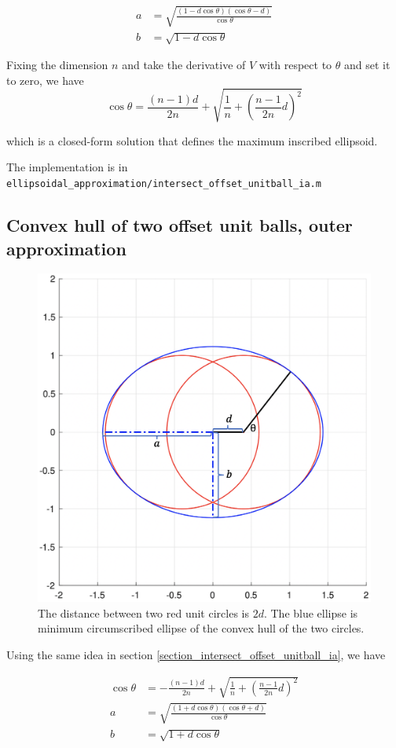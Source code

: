 \documentclass{article}
\begin{document}
\begin{align*}
a & = \sqrt{\frac{(1-d\cos\theta)(\cos\theta-d)}{\cos\theta}}\\
b & = \sqrt{1 - d\cos\theta}
\end{align*}

Fixing the dimension $n$ and take the derivative of $V$ with respect to $\theta$ and set it to zero, we have 
$$
\cos\theta = \frac{(n-1)d}{2n} + \sqrt{\frac{1}{n} + \left(\frac{n-1}{2n}d\right)^2}
$$

which is a closed-form solution that defines the maximum inscribed ellipsoid.

The implementation is in \texttt{ellipsoidal\_approximation/intersect\_offset\_unitball\_ia.m}

\subsection{Convex hull of two offset unit balls, outer approximation}
\begin{figure}[H]
	\centering
	\includegraphics[width=0.6\linewidth]{union_offset_unitball_oa/1.png}
	\caption{The distance between two red unit circles is $2d$. The blue ellipse is minimum circumscribed ellipse of the convex hull of the two circles.}
	\label{union_offset_unitball_oa}
\end{figure}

Using the same idea in section \ref{section_intersect_offset_unitball_ia}, we have

\begin{align*}
\cos\theta &= -\frac{(n-1)d}{2n} + \sqrt{\frac{1}{n} + \left(\frac{n-1}{2n}d\right)^2}\\
a & = \sqrt{\frac{(1+d\cos\theta)(\cos\theta+d)}{\cos\theta}}\\
b & = \sqrt{1 + d\cos\theta}
\end{align*}
\end{document}
